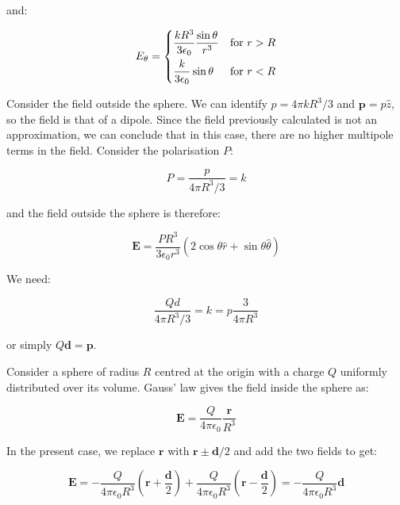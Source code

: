 \documentclass[12pt]{article}
\begin{document}
and:

\begin{equation}
E_{\theta} =
\begin{dcases}
    \frac{kR^{3}}{3\epsilon_{0}} \frac{\sin{\theta}}{r^{3}} & \text{for } r > R \\
    \frac{k}{3\epsilon_{0}} \sin{\theta} & \text{for } r < R
\end{dcases}
\end{equation}

Consider the field outside the sphere. We can identify $p = 4\pi kR^{3}/3$ and $\mathbf{p} = p \hat{z}$, so the field is that of a dipole. Since the field previously calculated is not an approximation, we can conclude that in this case, there are no higher multipole terms in the field. Consider the polarisation $P$:

\begin{equation}
    P = \frac{p}{4\pi R^{3}/3} = k
\end{equation}

and the field outside the sphere is therefore:

\begin{equation}
    \mathbf{E} = \frac{PR^{3}}{3\epsilon_{0}r^{3}} \left( 2\cos{\theta} \hat{r} + \sin{\theta} \hat{\theta} \right)
\end{equation}

We need:

\begin{equation}
    \frac{Qd}{4\pi R^{3}/3} = k = p \frac{3}{4\pi R^{3}}
\end{equation}

or simply $Q\mathbf{d} = \mathbf{p}$.

Consider a sphere of radius $R$ centred at the origin with a charge $Q$ uniformly distributed over its volume. Gauss' law gives the field inside the sphere as:

\begin{equation}
    \mathbf{E} = \frac{Q}{4\pi\epsilon_{0}} \frac{\mathbf{r}}{R^{3}}
\end{equation}

In the present case, we replace $\mathbf{r}$ with $\mathbf{r} \pm \mathbf{d}/2$ and add the two fields to get:

\begin{equation}
    \mathbf{E} = -\frac{Q}{4\pi\epsilon_{0}R^{3}} \left( \mathbf{r} + \frac{\mathbf{d}}{2} \right) + \frac{Q}{4\pi\epsilon_{0}R^{3}} \left( \mathbf{r} - \frac{\mathbf{d}}{2} \right) = -\frac{Q}{4\pi\epsilon_{0}R^{3}} \mathbf{d}
\end{equation}
\end{document}
